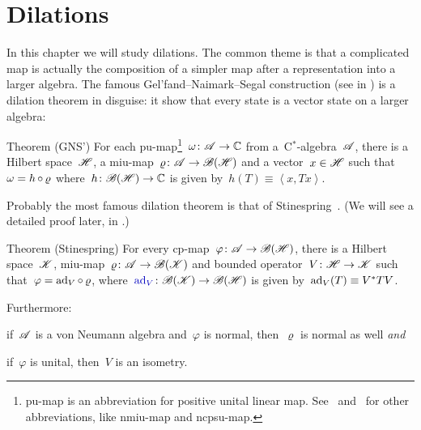 \documentclass[b]{subfiles}
\begin{document}
\chapter{Dilations}\label{chapter1}

\begin{parsec}%
\begin{point}%
In this chapter we will study dilations.
The common theme is that a complicated map
    is actually the composition of a simpler map
    after a representation into a larger algebra.
    The famous Gel'fand--Naimark--Segal construction (see 
        in \cite{bram})
    is a dilation theorem in disguise:
    it show that every state is a vector state on a larger algebra:
\end{point}
\begin{point}{Theorem (GNS')}%
    For each pu-map\footnote{%
        pu-map is an abbreviation for positive unital linear map.
        See~ and~
            for other abbreviations, like nmiu-map
            and ncpsu-map.
        }~$\omega\colon \mathscr{A} \to \mathbb{C}$
        from a~C$^*$-algebra~$\mathscr{A}$,
    there is a Hilbert space~$\mathscr{H}$,
    a miu-map~$\varrho\colon \mathscr{A} \to \mathscr{B}(\mathscr{H})$
    and a vector~$x \in \mathscr{H}$
    such that~$\omega = h \mathop{\circ} \varrho$
    where~$h \colon \mathscr{B}(\mathscr{H}) \to \mathbb{C}$
    is given by~$h(T) \equiv \left<x,Tx\right>$.
\end{point}

\begin{point}%
Probably the most famous dilation theorem is that
of Stinespring~\cite[Thm.~1]{stinespring}.
(We will see a detailed proof later, in .)
\end{point}

\begin{point}{Theorem (Stinespring)}
    For every cp-map~$\varphi\colon \mathscr{A} \to \mathscr{B} (\mathscr{H})$,
    there is a Hilbert space~$\mathscr{K}$,
        miu-map~$\varrho\colon \mathscr{A} \to \mathscr{B}(\mathscr{K})$
        and bounded operator~$V\colon \mathscr{H} \to \mathscr{K}$
        such that~$\varphi = \mathrm{ad}_V \mathop{\circ} \varrho$,
        where~$\Define{\ad_V}\index{$\ad_V$!Hilbert spaces} \colon \scrB(\scrK) \to \scrB(\scrH)$
        is given by~$\mathrm{ad}_V(T)\equiv V^*TV$.

Furthermore:
\begin{inparaenum}
\item
    if~$\mathscr{A}$ is a von Neumann algebra
    and~$\varphi$ is normal, then~$\varrho$ is normal as well \emph{and}
\item
    if~$\varphi$ is unital, then~$V$ is an isometry.
\end{inparaenum}
\end{point}


\end{parsec}
\end{document}
